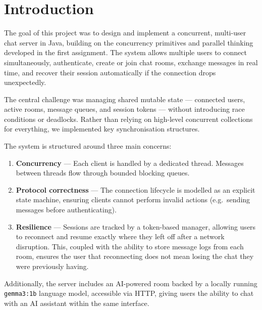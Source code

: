 \documentclass[12pt,a4paper]{article}
\begin{document}
\tableofcontents
\clearpage

\listoffigures
\clearpage

\section{Introduction}
\label{sec:intro}

The goal of this project was to design and implement a concurrent, multi-user
chat server in Java, building on the concurrency primitives and parallel
thinking developed in the first assignment. The system allows multiple users to
connect simultaneously, authenticate, create or join chat rooms, exchange
messages in real time, and recover their session automatically if the
connection drops unexpectedly.

The central challenge was managing shared mutable state --- connected users,
active rooms, message queues, and session tokens --- without introducing race
conditions or deadlocks. Rather than relying on high-level concurrent
collections for everything, we implemented key synchronisation structures.

The system is structured around three main concerns:

\begin{enumerate}
  \item \textbf{Concurrency} --- Each client is handled by a dedicated thread.
        Messages between threads flow through bounded blocking queues.
  \item \textbf{Protocol correctness} --- The connection lifecycle is modelled
        as an explicit state machine, ensuring clients cannot perform invalid
        actions (e.g.\ sending messages before authenticating).
  \item \textbf{Resilience} --- Sessions are tracked by a token-based manager,
        allowing users to reconnect and resume exactly where they left off after
        a network disruption. This, coupled with the ability to store message logs
        from each room, ensures the user that reconnecting does not mean losing 
        the chat they were previously having.
\end{enumerate}

Additionally, the server includes an AI-powered room backed by a locally
running \texttt{gemma3:1b} language model, accessible via HTTP, giving users
the ability to chat with an AI assistant within the same interface.
\end{document}
